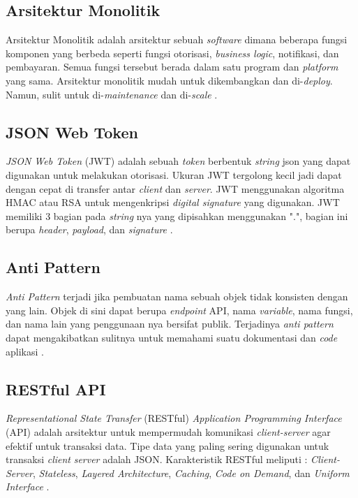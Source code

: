 \subsection{Arsitektur Monolitik}
Arsitektur Monolitik adalah arsitektur sebuah \textit{software} dimana beberapa fungsi komponen yang berbeda seperti fungsi otorisasi, \textit{business logic}, notifikasi, dan pembayaran. Semua fungsi tersebut berada dalam satu program dan \textit{platform} yang sama. Arsitektur monolitik mudah untuk dikembangkan dan di-\textit{deploy}. Namun, sulit untuk di-\textit{maintenance} dan di-\textit{scale} \cite{gos2020comparison}. 


\subsection{JSON Web Token}
\textit{JSON Web Token} (JWT) adalah sebuah \textit{token} berbentuk \textit{string} json yang dapat digunakan untuk melakukan otorisasi. Ukuran JWT tergolong kecil jadi dapat dengan cepat di transfer antar \textit{client} dan \textit{server}. JWT menggunakan algoritma HMAC atau RSA untuk mengenkripsi \textit{digital signature} yang digunakan. JWT memiliki 3 bagian pada \textit{string} nya yang dipisahkan menggunakan ".", bagian ini berupa \textit{header}, \textit{payload}, dan \textit{signature} \cite{rahmatullo2019stateless}.

\subsection{Anti Pattern}
\textit{Anti Pattern} terjadi jika pembuatan nama sebuah objek tidak konsisten dengan yang lain. Objek di sini dapat berupa \textit{endpoint} API, nama \textit{variable}, nama fungsi, dan nama lain yang penggunaan nya bersifat publik. Terjadinya \textit{anti pattern} dapat mengakibatkan sulitnya untuk memahami suatu dokumentasi dan \textit{code} aplikasi \cite{Aghajani2018} \cite{Alshraiedeh2021}.

\subsection{RESTful API}
\textit{Representational State Transfer} (RESTful) \textit{Application Programming Interface} (API) adalah arsitektur untuk mempermudah komunikasi \textit{client-server} agar efektif untuk transaksi data. Tipe data yang paling sering digunakan untuk transaksi \textit{client} \textit{server} adalah JSON. Karakteristik RESTful meliputi : \textit{Client-Server}, \textit{Stateless}, \textit{Layered Architecture}, \textit{Caching}, \textit{Code on Demand}, dan \textit{Uniform Interface} \cite{giessler2015best}.

